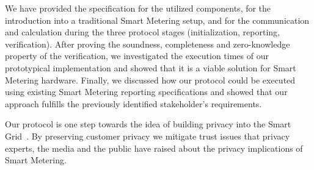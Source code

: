 \documentclass[english]{llncs}
\begin{document}
We have provided the specification for the utilized components, for the introduction into a traditional Smart Metering setup, and for the communication and calculation during the three protocol stages (initialization, reporting, verification). After proving the soundness, completeness and zero-knowledge property of the verification, we investigated the execution times of our prototypical implementation and showed that it is a viable solution for Smart Metering hardware. 
Finally, we discussed how our protocol could be executed using existing Smart Metering reporting specifications and showed that our approach fulfills the previously identified stakeholder's requirements.

Our protocol is one step towards the idea of building privacy into the Smart Grid~\cite{smartgridprivacy}. By preserving customer privacy we mitigate trust issues that privacy experts, the media and the public have raised about the privacy implications of Smart Metering. 




\end{document}
